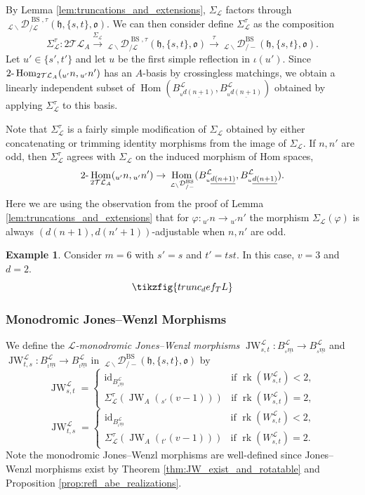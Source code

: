 \documentclass{amsart}
\newcommand{\scrL}{\mathcal{L}}
\DeclareMathOperator{\Hom}{Hom}
\newcommand{\TwoHom}{2\textnormal{-}\Hom}
\DeclareMathOperator{\id}{id}
\DeclareMathOperator{\rk}{rk}
\newcommand{\fr}[1]{\mathfrak{#1}}
\DeclareMathOperator{\BS}{BS}
\newcommand{\TLcat}{2\mathcal{T}\mathcal{L}}
\DeclareMathOperator{\JW}{JW}
\newcommand{\EWmon}[2]{\:_{#1 \backslash} \mathcal{D}_{/ #2} }
\theoremstyle{definition}
\newtheorem{example}[subsubsection]{Example}
\numberwithin{equation}{subsection}
\begin{document}
By Lemma \ref{lem:truncations_and_extensions},  $\Sigma_{\scrL}$ factors through $\EWmon{\scrL}{\scrL}^{\BS, \tau} (\fr{h}, \{s,t\}, \fr{o})$.
We can then consider define $\Sigma_{\scrL}^{\tau}$ as the composition
\[\Sigma_{\scrL}^{\tau} : \TLcat_A \stackrel{\Sigma_{\scrL}}{\to} \EWmon{\scrL}{\scrL}^{\BS, \tau} (\fr{h}, \{s,t\}, \fr{o}) \stackrel{\tau}{\to} \EWmon{\scrL}{-}^{\BS} (\fr{h}, \{s,t\}, \fr{o}).\]
Let $u' \in \{s',t'\}$ and let $u$ be the first simple reflection in $\iota (u')$.
Since $\TwoHom_{\TLcat_A} ({}_{u'} n, {}_{u'} n')$ has an $A$-basis by crossingless matchings, we obtain a linearly independent subset of $\Hom (B_{{}_u \underline{d(n+1)}}^{\scrL}, B_{{}_u \underline{d(n+1)}}^{\scrL})$
obtained by applying $\Sigma_{\scrL}^{\tau}$ to this basis.

Note that $\Sigma_{\scrL}^{\tau}$ is a fairly simple modification of $\Sigma_{\scrL}$ obtained by either concatenating or trimming identity morphisms from the image of $\Sigma_{\scrL}$.
If $n, n'$ are odd, then $\Sigma_{\scrL}^{\tau}$ agrees with $\Sigma_{\scrL}$ on the induced morphism of Hom spaces,
\[\TwoHom_{\TLcat_A} ({}_{u'} n, {}_{u'} n') \to \Hom_{\EWmon{\scrL}{-}^{\BS}} (B_{{}_u \underline{d(n+1)}}^{\scrL}, B_{{}_u \underline{d(n+1)}}^{\scrL}).\]
Here we are using the observation from the proof of Lemma \ref{lem:truncations_and_extensions} that for $\varphi : {}_{u'} n \to {}_{u'} n'$ the morphism $\Sigma_{\scrL} (\varphi)$ is always $(d(n+1), d(n'+1))$-adjustable when $n,n'$ are odd.

\begin{example}
    Consider $m = 6$ with $s' = s$ and $t' = tst$.
    In this case, $v = 3$ and $d=2$.
    \[\tikzfig{trunc_def_TL}\]
\end{example}

\subsubsection{Monodromic Jones--Wenzl Morphisms}

We define the \emph{$\scrL$-monodromic Jones--Wenzl morphisms} $\JW_{s,t}^{\scrL} : B_{{}_s \underline{m}}^{\scrL} \to B_{{}_s \underline{m}}^{\scrL}$ and $\JW_{t,s}^{\scrL} : B_{{}_t \underline{m}}^{\scrL} \to B_{{}_t \underline{m}}^{\scrL}$ in $\EWmon{\scrL}{-}^{\BS} (\fr{h}, \{s,t\}, \fr{o})$ by 
\[ \JW_{s,t}^{\scrL} = \begin{cases} \id_{B_{{}_s \underline{m}}^{\scrL} } & \text{if } \rk (W_{s,t}^{\scrL}) < 2, \\ \Sigma_{\scrL}^{\tau} (\JW_A ({}_{s'} (v-1))) & \text{if } \rk (W_{s,t}^{\scrL}) = 2, \end{cases}\]
\[\JW_{t,s}^{\scrL} = \begin{cases} \id_{ B_{{}_t \underline{m}}^{\scrL}} & \text{if } \rk (W_{s,t}^{\scrL}) < 2, \\ \Sigma_{\scrL}^{\tau} (\JW_A ({}_{t'} (v-1))) & \text{if } \rk (W_{s,t}^{\scrL}) = 2. \end{cases} \]
Note the monodromic Jones--Wenzl morphisms are well-defined since Jones--Wenzl morphisms exist by Theorem \ref{thm:JW_exist_and_rotatable} and Proposition \ref{prop:refl_abe_realizations}.
\end{document}
